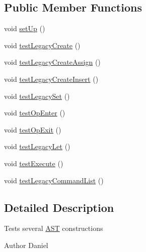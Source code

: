 \subsection*{Public Member Functions}
\begin{DoxyCompactItemize}
\item 
void \hyperlink{classorg_1_1tzi_1_1use_1_1parser_1_1shell_1_1_a_s_t_construction_test_ac3132f329327fd1358514dcad2e17dd6}{set\-Up} ()
\item 
void \hyperlink{classorg_1_1tzi_1_1use_1_1parser_1_1shell_1_1_a_s_t_construction_test_affcf24c5fe2f34f3f2048609bc83782e}{test\-Legacy\-Create} ()
\item 
void \hyperlink{classorg_1_1tzi_1_1use_1_1parser_1_1shell_1_1_a_s_t_construction_test_abbf3c0da62b81c574944c5a2abd179a7}{test\-Legacy\-Create\-Assign} ()
\item 
void \hyperlink{classorg_1_1tzi_1_1use_1_1parser_1_1shell_1_1_a_s_t_construction_test_a273f96fb37b71ffd66be05c0ec5599d3}{test\-Legacy\-Create\-Insert} ()
\item 
void \hyperlink{classorg_1_1tzi_1_1use_1_1parser_1_1shell_1_1_a_s_t_construction_test_aebe9de9782e008f684d5952828f3428c}{test\-Legacy\-Set} ()
\item 
void \hyperlink{classorg_1_1tzi_1_1use_1_1parser_1_1shell_1_1_a_s_t_construction_test_a10ca2216362ee2ca71d2653597151685}{test\-Op\-Enter} ()
\item 
void \hyperlink{classorg_1_1tzi_1_1use_1_1parser_1_1shell_1_1_a_s_t_construction_test_a87e045fbc978a13fddc0d3268c4f0c05}{test\-Op\-Exit} ()
\item 
void \hyperlink{classorg_1_1tzi_1_1use_1_1parser_1_1shell_1_1_a_s_t_construction_test_aa5bc58cca28ff5b0bca2abb7f4ae533f}{test\-Legacy\-Let} ()
\item 
void \hyperlink{classorg_1_1tzi_1_1use_1_1parser_1_1shell_1_1_a_s_t_construction_test_a307070584b3ee1d937fdb87edcb4355f}{test\-Execute} ()
\item 
void \hyperlink{classorg_1_1tzi_1_1use_1_1parser_1_1shell_1_1_a_s_t_construction_test_a65410f40365909ec34c11400407a6106}{test\-Legacy\-Command\-List} ()
\end{DoxyCompactItemize}


\subsection{Detailed Description}
Tests several \hyperlink{classorg_1_1tzi_1_1use_1_1parser_1_1_a_s_t}{A\-S\-T} constructions \begin{DoxyAuthor}{Author}
Daniel 
\end{DoxyAuthor}


